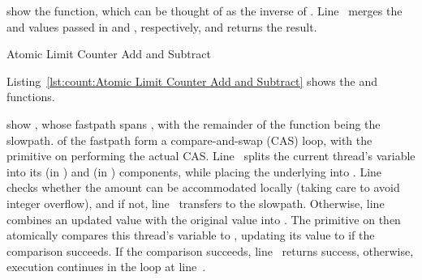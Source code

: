 \QuickQuizEnd

\begin{fcvref}
 show the  function, which
can be thought of as the inverse of .
Line~ merges the  and 
values passed in  and , respectively, and returns
the result.
\end{fcvref}

\QuickQuizEnd

\begin{listing}
\caption{Atomic Limit Counter Add and Subtract}
\label{lst:count:Atomic Limit Counter Add and Subtract}
\end{listing}

Listing~\ref{lst:count:Atomic Limit Counter Add and Subtract}
shows the  and  functions.

\begin{fcvref}
 show , whose fastpath spans
,
with the remainder of the function being the slowpath.
 of the fastpath form a compare-and-swap
(CAS) loop, with
the  primitive on
 performing the
actual CAS\@.
Line~ splits the current thread's  variable into its
 (in ) and  (in ) components,
while placing the underlying  into .
Line~ checks whether the amount  can be accommodated
locally (taking care to avoid integer overflow), and if not,
line~ transfers to the slowpath.
Otherwise, line~ combines an updated  value with the
original  value into .
The  primitive on
 then atomically
compares this thread's  variable to ,
updating its value to  if the comparison succeeds.
If the comparison succeeds, line~ returns success, otherwise,
execution continues in the loop at line~.
\end{fcvref}

